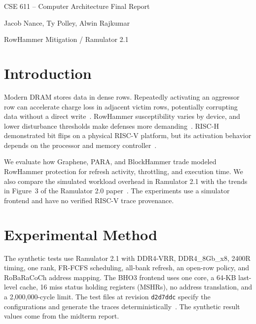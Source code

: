 \documentclass[11pt,letterpaper]{article}
\begin{document}
\begin{center}
{\LARGE\color{reportblue} CSE 611 -- Computer Architecture Final Report\par}
\vspace{9pt}
Jacob Nance, Ty Polley, Alwin Rajkumar\par
\vspace{9pt}
RowHammer Mitigation / Ramulator 2.1\par
\end{center}
\vspace{3pt}

\section{Introduction}
Modern DRAM stores data in dense rows. Repeatedly activating an aggressor row can accelerate charge loss in adjacent victim rows, potentially corrupting data without a direct write~\cite{kim2014}. RowHammer susceptibility varies by device, and lower disturbance thresholds make defenses more demanding~\cite{revisiting2020}. RISC-H demonstrated bit flips on a physical RISC-V platform, but its activation behavior depends on the processor and memory controller~\cite{risch2024}.

We evaluate how Graphene, PARA, and BlockHammer trade modeled RowHammer protection for refresh activity, throttling, and execution time. We also compare the simulated workload overhead in Ramulator 2.1 with the trends in Figure~3 of the Ramulator 2.0 paper~\cite{ramulator20,ramulator21,ramulatorrepo}. The experiments use a simulator frontend and have no verified RISC-V trace provenance.


\section{Experimental Method}
The synthetic tests use Ramulator 2.1 with DDR4-VRR, DDR4\_8Gb\_x8, 2400R timing, one rank, FR-FCFS scheduling, all-bank refresh, an open-row policy, and RoBaRaCoCh address mapping. The BHO3 frontend uses one core, a 64-KB last-level cache, 16 miss status holding registers (MSHRs), no address translation, and a 2,000,000-cycle limit. The test files at revision \texttt{d2d7ddc} specify the configurations and generate the traces deterministically~\cite{projecttests}. The synthetic result values come from the midterm report.
\end{document}
